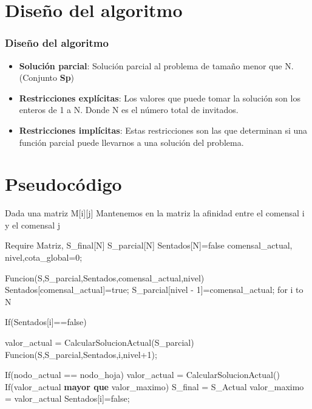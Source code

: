 \documentclass{beamer}
\begin{document}
\section{Diseño del algoritmo} 
\begin{frame}
	\frametitle{Diseño del algoritmo}
	\begin{itemize}
		\item \textbf{Solución parcial}: Solución parcial al problema de tamaño menor que N. (Conjunto \textbf{Sp})
		\item \textbf{Restricciones explícitas}: Los valores que puede tomar la solución son los enteros de 1 a N. Donde N es el número total de invitados.  
		\item \textbf{Restricciones implícitas}: Estas restricciones son las que determinan si una función parcial puede llevarnos a una solución del problema.
	\end{itemize}
	
\end{frame}

\section{Pseudocódigo}
\begin{frame}
	Dada una matriz M[i][j] 
	Mantenemos en la matriz la afinidad  entre 
	el comensal i y el comensal j
\end{frame}
\begin{frame}
	Require Matriz, S\_final[N] S\_parcial[N] Sentados[N]={false} comensal\_actual, nivel,cota\_global=0;

	Funcion(S,S\_parcial,Sentados,comensal\_actual,nivel)
		Sentados[comensal\_actual]=true;
		S\_parcial[nivel - 1]=comensal\_actual;
		for i to N{
			If(Sentados[i]==false){
				valor\_actual = CalcularSolucionActual(S\_parcial)
				Funcion(S,S\_parcial,Sentados,i,nivel+1);
			
				If(nodo\_actual == nodo\_hoja){
					valor\_actual = CalcularSolucionActual()
					If(valor\_actual \textbf{mayor que} valor\_maximo){
						S\_final = S\_Actual
						valor\_maximo = valor\_actual
					} 
				}
				Sentados[i]=false;
			}						
		}
		
			
\end{frame}
\end{document}
